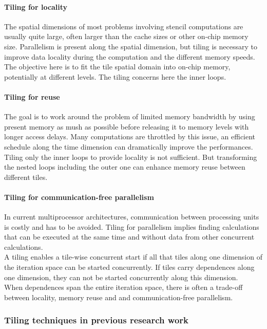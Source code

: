 \documentclass[a4paper,11pt]{article}
\begin{document}
  \paragraph{Tiling for locality} The spatial dimensions of most problems involving stencil computations 
  are usually quite large, often larger than the cache sizes or other on-chip memory
  size. Parallelism is present along the spatial dimension, but tiling is necessary to improve
  data locality during the computation and the different memory speeds.\\
  The objective here is to fit the tile spatial domain into on-chip memory, potentially at
  different levels. The tiling concerns here the inner loops.

  \paragraph{Tiling for reuse} The goal is to work around the problem of limited memory bandwidth
  by using present memory as mush as possible before releasing it to memory levels with
  longer access delays. Many computations are throttled by this issue, an efficient schedule
  along the time dimension can dramatically improve the performances. Tiling only the inner
  loops to provide locality is not sufficient. But transforming the nested loops including the
  outer one can enhance memory reuse between different tiles.
  
  \paragraph{Tiling for communication-free parallelism} In current multiprocessor architectures,
  communication between processing units is costly and has to be avoided. Tiling for parallelism 
  implies finding calculations that can be executed at the same time and without
  data from other concurrent calculations. \\
  A tiling enables a tile-wise concurrent start if all that tiles along one dimension of the iteration
  space can be started concurrently. If tiles carry dependences along one dimension,
  they can not be started concurrently along this dimension. \\
  When dependences span the entire iteration space, there is often a trade-off between locality,
  memory reuse and and communication-free parallelism.

\subsubsection{Tiling techniques in previous research work}
\end{document}
